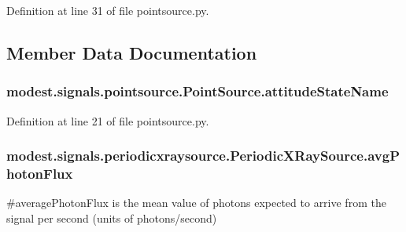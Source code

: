 Definition at line 31 of file pointsource.\+py.



\subsection{Member Data Documentation}
\subsubsection[{\texorpdfstring{attitude\+State\+Name}{attitudeStateName}}]{\setlength{\rightskip}{0pt plus 5cm}modest.\+signals.\+pointsource.\+Point\+Source.\+attitude\+State\+Name\hspace{0.3cm}{\ttfamily [inherited]}}\hypertarget{classmodest_1_1signals_1_1pointsource_1_1PointSource_a0924a2233bb4fd23e50d024e4f1b048e}{}\label{classmodest_1_1signals_1_1pointsource_1_1PointSource_a0924a2233bb4fd23e50d024e4f1b048e}


Definition at line 21 of file pointsource.\+py.

\subsubsection[{\texorpdfstring{avg\+Photon\+Flux}{avgPhotonFlux}}]{\setlength{\rightskip}{0pt plus 5cm}modest.\+signals.\+periodicxraysource.\+Periodic\+X\+Ray\+Source.\+avg\+Photon\+Flux}\hypertarget{classmodest_1_1signals_1_1periodicxraysource_1_1PeriodicXRaySource_ab18463cedaf7e9ea17447e46f341bbb0}{}\label{classmodest_1_1signals_1_1periodicxraysource_1_1PeriodicXRaySource_ab18463cedaf7e9ea17447e46f341bbb0}


\#average\+Photon\+Flux is the mean value of photons expected to arrive from the signal per second (units of photons/second) 



